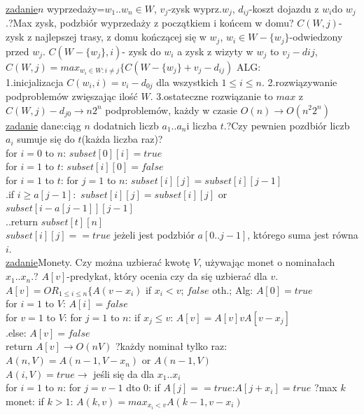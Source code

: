 \documentclass[8pt,a3paper]{article}
\begin{document}
\begin{multicols*}{3}
{	 \underline{zadanie}$n$ wyprzedaży=$w_{1}..w_{n}\in W$, $v_{j}$-zysk wyprz.$w_{j}$, $d_{ij}$-koszt dojazdu z $w_{i}$do $w_{j}$.?Max zysk, podzbiór wyprzedaży z początkiem i końcem w domu? $C(W,j)$-zysk z najlepszej trasy, z domu kończącej się w $w_{j}$, $w_{i} \in W-\{w_{j}\}$-odwiedzony przed $w_{j}$. $C(W-\{w_{j}\},i)$- zysk do $w_{i}$ a zysk z wizyty w $w_{j}$ to $v_{j}-d{ij}$, $C(W,j)=max_{w_{i} \in W: i \neq j}\{C(W-\{w_{j}\}+v_{j}-d_{ij})$ ALG:\\ 1.inicjalizacja $C(w_{i},i)=v_{i}-d_{0j}$ dla wszystkich $1 \leq i \leq n$. 2.rozwiązywanie podproblemów zwięszając ilość $W$. 3.ostateczne rozwiązanie to $max$ z $C(W,j)-d_{j0} \to n2^{n}$ podproblemów, każdy w czasie $O(n) \to O(n^{2}2^{n})$\\
	 \underline{zadanie} dane:ciąg $n$ dodatnich liczb $a_{1}..a_{n}$i liczba $t$.?Czy pewnien pozdbiór liczb $a_{i}$ sumuje się do $t$(każda liczba raz)?\\
	 for $i=0$ to $n$: $subset[0][i]=true$\\
	 for $i=1$ to $t$: $subset[i][0]=false$\\
	 for $i=1$ to $t$: for $j=1$ to $n$: $subset[i][j]=subset[i][j-1]$\\
	 .\quad if $i\geq a[j-1]:$ $subset[i][j]=subset[i][j]$ or\\ $subset[i-a[j-1]][j-1]$ \\
	 .\quad.\quad return $subset[t][n]$\\
	 $subset[i][j]==true$ jeżeli jest podzbiór $a[0..j-1]$, którego suma jest równa $i$.\\
	 \underline{zadanie}Monety. Czy można uzbierać kwotę $V$, używając monet o nominałach $x_{1}..x_{n}.$? $A[v]$-predykat, który ocenia czy da się uzbierać dla $v$. $A[v]=OR_{1 \leq i \leq n}\{A(v-x_{i})$ if $x_{i}<v$; $false$ oth.; Alg: $A[0]=true$\\
	 for $i=1$ to $V$: $A[i]=false$\\
	 for $v=1$ to $V$: for $j=1$ to $n$: if $x_{j} \leq v$: $A[v]=A[v]vA[v-x_{j}]$\\
	 .\quad else: $A[v]=false$\\
	 return $A[v] \to O(nV)$ \qquad ?każdy nominał tylko raz:\\
	 $A(n,V)=A(n-1,V-x_{n})$ or $A(n-1,V)$\\
	 $A(i,V)=true \to$ jeśli się da dla $x_{1}..x_{i}$ \\
	 for $i=1$ to $n$: for $j=v-1$ dto $0$: if $A[j]==true$:$A[j+x_{i}]=true$
	 ?max $k$ monet: if $k>1$: $A(k,v)=max_{x_{i}<v}A(k-1,v-x_{i})$\\
}
\end{multicols*}
\end{document}
